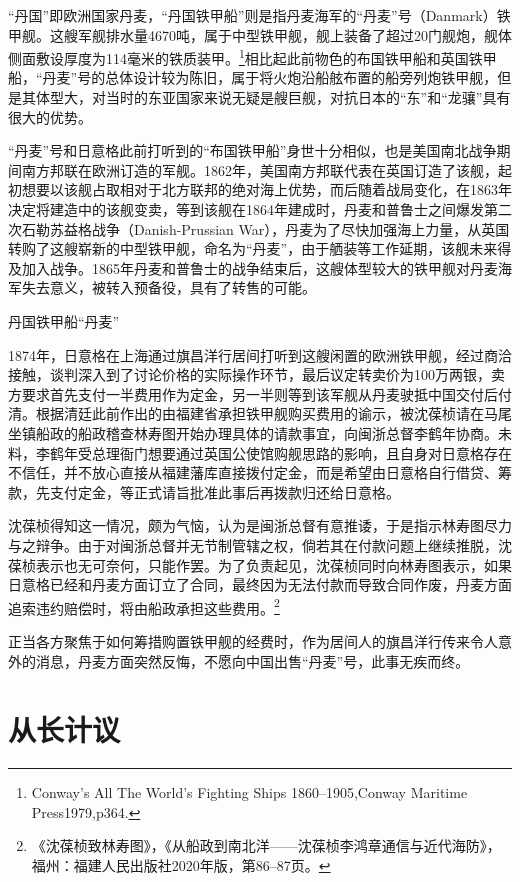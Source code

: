 \documentclass[12pt,UTF8]{ctexbook}
\begin{document}
“丹国”即欧洲国家丹麦，“丹国铁甲船”则是指丹麦海军的“丹麦”号（Danmark）铁甲舰。这艘军舰排水量4670吨，属于中型铁甲舰，舰上装备了超过20门舰炮，舰体侧面敷设厚度为114毫米的铁质装甲。\footnote{Conway's All The World's Fighting Ships 1860--1905,Conway Maritime Press1979,p364.}相比起此前物色的布国铁甲船和英国铁甲船，“丹麦”号的总体设计较为陈旧，属于将火炮沿船舷布置的船旁列炮铁甲舰，但是其体型大，对当时的东亚国家来说无疑是艘巨舰，对抗日本的“东”和“龙骧”具有很大的优势。

“丹麦”号和日意格此前打听到的“布国铁甲船”身世十分相似，也是美国南北战争期间南方邦联在欧洲订造的军舰。1862年，美国南方邦联代表在英国订造了该舰，起初想要以该舰占取相对于北方联邦的绝对海上优势，而后随着战局变化，在1863年决定将建造中的该舰变卖，等到该舰在1864年建成时，丹麦和普鲁士之间爆发第二次石勒苏益格战争（Danish-Prussian War），丹麦为了尽快加强海上力量，从英国转购了这艘崭新的中型铁甲舰，命名为“丹麦”，由于舾装等工作延期，该舰未来得及加入战争。1865年丹麦和普鲁士的战争结束后，这艘体型较大的铁甲舰对丹麦海军失去意义，被转入预备役，具有了转售的可能。

丹国铁甲船“丹麦”

1874年，日意格在上海通过旗昌洋行居间打听到这艘闲置的欧洲铁甲舰，经过商洽接触，谈判深入到了讨论价格的实际操作环节，最后议定转卖价为100万两银，卖方要求首先支付一半费用作为定金，另一半则等到该军舰从丹麦驶抵中国交付后付清。根据清廷此前作出的由福建省承担铁甲舰购买费用的谕示，被沈葆桢请在马尾坐镇船政的船政稽查林寿图开始办理具体的请款事宜，向闽浙总督李鹤年协商。未料，李鹤年受总理衙门想要通过英国公使馆购舰思路的影响，且自身对日意格存在不信任，并不放心直接从福建藩库直接拨付定金，而是希望由日意格自行借贷、筹款，先支付定金，等正式请旨批准此事后再拨款归还给日意格。

沈葆桢得知这一情况，颇为气恼，认为是闽浙总督有意推诿，于是指示林寿图尽力与之辩争。由于对闽浙总督并无节制管辖之权，倘若其在付款问题上继续推脱，沈葆桢表示也无可奈何，只能作罢。为了负责起见，沈葆桢同时向林寿图表示，如果日意格已经和丹麦方面订立了合同，最终因为无法付款而导致合同作废，丹麦方面追索违约赔偿时，将由船政承担这些费用。\footnote{《沈葆桢致林寿图》，《从船政到南北洋——沈葆桢李鸿章通信与近代海防》，福州：福建人民出版社2020年版，第86--87页。}

正当各方聚焦于如何筹措购置铁甲舰的经费时，作为居间人的旗昌洋行传来令人意外的消息，丹麦方面突然反悔，不愿向中国出售“丹麦”号，此事无疾而终。

\section{从长计议}
\end{document}
